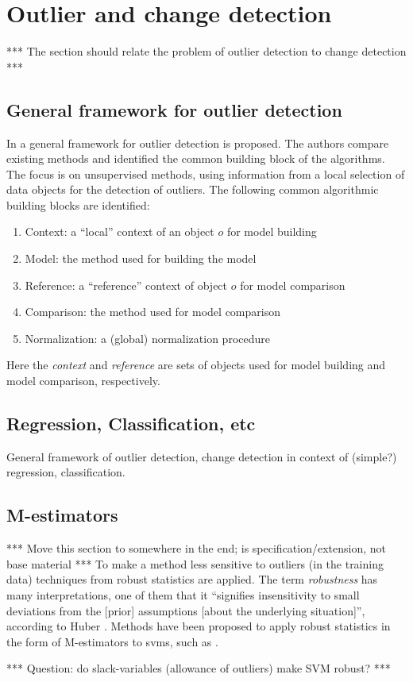 \section{Outlier and change detection}\label{sec:outlier_detection}
*** The section should relate the problem of outlier detection to change detection ***

\subsection{General framework for outlier detection}
In \cite{schubert2012local} a general framework for outlier detection is proposed.
The authors compare existing methods and identified the common building block of the algorithms.
The focus is on unsupervised methods, using information from a local selection of data objects for the detection of outliers.
The following common algorithmic building blocks are identified:

\begin{enumerate}
  \item Context: a ``local'' context of an object $o$ for model building
  \item Model: the method used for building the model
  \item Reference: a ``reference'' context of object $o$ for model comparison
  \item Comparison: the method used for model comparison
  \item Normalization: a (global) normalization procedure
\end{enumerate}

Here the \emph{context} and \emph{reference} are sets of objects used for model building and model comparison, respectively.


\subsection{Regression, Classification, etc}

General framework of outlier detection, change detection in context of (simple?) regression, classification.

\subsection{M-estimators}
*** Move this section to somewhere in the end; is specification/extension, not base material ***
To make a method less sensitive to outliers (in the training data) techniques from robust statistics are applied.
The term \emph{robustness} has many interpretations, one of them that it ``signifies insensi­tivity to small deviations from the [prior] assumptions [about the underlying situation]'', according to Huber \cite{huber2009robust}.
Methods have been proposed to apply robust statistics in the form of M-estimators to \glspl{svm}, such as \cite{choi2009least,chen2004m,suykens1999least}.

*** Question: do slack-variables (allowance of outliers) make SVM robust? ***
